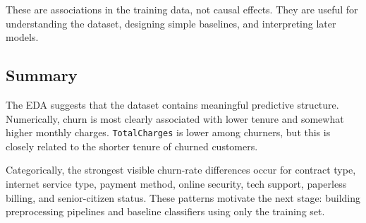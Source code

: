 These are associations in the training data, not causal effects. They are useful for understanding the dataset, designing simple baselines, and interpreting later models.

\subsection{Summary}

The EDA suggests that the dataset contains meaningful predictive structure. Numerically, churn is most clearly associated with lower tenure and somewhat higher monthly charges. \texttt{TotalCharges} is lower among churners, but this is closely related to the shorter tenure of churned customers.

Categorically, the strongest visible churn-rate differences occur for contract type, internet service type, payment method, online security, tech support, paperless billing, and senior-citizen status. These patterns motivate the next stage: building preprocessing pipelines and baseline classifiers using only the training set.

